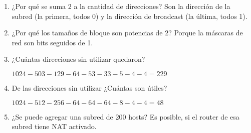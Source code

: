 \begin{enumerate}[start=2, left=0cm]
    \item ¿Por qué se suma 2 a la cantidad de direcciones? Son la dirección de la subred (la primera, todos 0) y la dirección de broadcast (la última, todos 1).

    \item ¿Por qué los tamaños de bloque son potencias de 2? Porque la máscaras de red son bits seguidos de 1.

    \item ¿Cuántas direcciones sin utilizar quedaron?
    
    \hfil$1024 - 503 - 129 - 64 - 53 - 33 - 5 - 4 - 4 = 229$\hfil

    \item De las direcciones sin utilizar ¿Cuántas son útiles?
    
    \hfil$1024 - 512 - 256 - 64 - 64 - 64 - 8 - 4 - 4 = 48$\hfil

    \item ¿Se puede agregar una subred de 200 hosts? Es posible, si el router de esa subred tiene NAT activado.

\end{enumerate}
